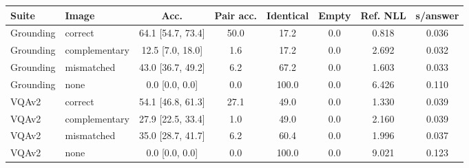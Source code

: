 \begin{tabular}{llcccccc}
\toprule
Suite & Image & Acc. & Pair acc. & Identical & Empty & Ref. NLL & s/answer \\
\midrule
Grounding & correct & 64.1 [54.7, 73.4] & 50.0 & 17.2 & 0.0 & 0.818 & 0.036 \\
Grounding & complementary & 12.5 [7.0, 18.0] & 1.6 & 17.2 & 0.0 & 2.692 & 0.032 \\
Grounding & mismatched & 43.0 [36.7, 49.2] & 6.2 & 67.2 & 0.0 & 1.603 & 0.033 \\
Grounding & none & 0.0 [0.0, 0.0] & 0.0 & 100.0 & 0.0 & 6.426 & 0.110 \\
\midrule
VQAv2 & correct & 54.1 [46.8, 61.3] & 27.1 & 49.0 & 0.0 & 1.330 & 0.039 \\
VQAv2 & complementary & 27.9 [22.5, 33.4] & 1.0 & 49.0 & 0.0 & 2.160 & 0.039 \\
VQAv2 & mismatched & 35.0 [28.7, 41.7] & 6.2 & 60.4 & 0.0 & 1.996 & 0.037 \\
VQAv2 & none & 0.0 [0.0, 0.0] & 0.0 & 100.0 & 0.0 & 9.021 & 0.123 \\
\bottomrule
\end{tabular}
